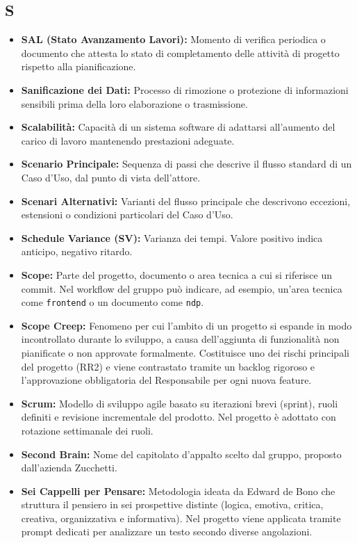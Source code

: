 \subsection*{S}
\begin{itemize}[leftmargin=*]
      \item \textbf{SAL (Stato Avanzamento Lavori):} Momento di verifica periodica o documento che attesta lo stato di completamento delle attività di progetto rispetto alla pianificazione.
      \item \textbf{Sanificazione dei Dati:} Processo di rimozione o protezione di informazioni sensibili prima della loro elaborazione o trasmissione.
      \item \textbf{Scalabilità:} Capacità di un sistema software di adattarsi all’aumento del carico di lavoro mantenendo prestazioni adeguate.
      \item \textbf{Scenario Principale:} Sequenza di passi che descrive il flusso standard di un Caso d'Uso, dal punto di vista dell'attore.
      \item \textbf{Scenari Alternativi:} Varianti del flusso principale che descrivono eccezioni, estensioni o condizioni particolari del Caso d'Uso.
      \item \textbf{Schedule Variance (SV):} Varianza dei tempi.
      Valore positivo indica anticipo, negativo ritardo.
      \item \textbf{Scope:} Parte del progetto, documento o area tecnica a cui si riferisce
      un commit. Nel workflow del gruppo può indicare, ad esempio, un'area tecnica come
      \texttt{frontend} o un documento come \texttt{ndp}.
      \item \textbf{Scope Creep:} Fenomeno per cui l'ambito di un progetto si espande
      in modo incontrollato durante lo sviluppo, a causa dell'aggiunta di
      funzionalità non pianificate o non approvate formalmente. Costituisce uno
      dei rischi principali del progetto (RR2) e viene contrastato tramite un
      backlog rigoroso e l'approvazione obbligatoria del
      Responsabile per ogni nuova feature.
      \item \textbf{Scrum:} Modello di sviluppo agile basato su iterazioni brevi (sprint), ruoli definiti e revisione incrementale del prodotto. Nel progetto è adottato con rotazione settimanale dei ruoli.
      \item \textbf{Second Brain:} Nome del capitolato d'appalto scelto dal gruppo, proposto dall'azienda Zucchetti.
      \item \textbf{Sei Cappelli per Pensare:} Metodologia ideata da Edward de Bono che struttura il pensiero in sei prospettive distinte (logica, emotiva, critica, creativa, organizzativa e informativa). Nel progetto viene applicata tramite prompt dedicati per analizzare un testo secondo diverse angolazioni.

\end{itemize}
